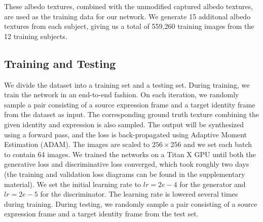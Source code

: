 These albedo textures, combined with the unmodified captured albedo textures, are used as the training data for our network. We generate 15 additonal albedo textures from each subject, giving us a total of 559,260 training images from the 12 training subjects.

\subsection{Training and Testing}

We divide the dataset into a training set and a testing set. During training, we train the network in an end-to-end fashion. On each iteration, we randomly sample a pair consisting of a source expression frame and a target identity frame from the dataset as input. The corresponding ground truth texture combining the given identity and expression is also sampled. The output will be synthesized using a forward pass, and the loss is back-propagated using Adaptive Moment Estimation (ADAM). The images are scaled to $256 \times 256$ and we set each batch to contain 64 images. We trained the networks on a Titan X GPU until both the generative loss and discriminative loss converged, which took roughly two days (the training and validation loss diagrams can be found in the supplementary material). We set the initial learning rate to $lr=2e-4$ for the generator and $lr=2e-5$ for the discriminator. The learning rate is lowered several times during training. During testing, we randomly sample a pair consisting of a source expression frame and a target identity frame from the test set.
